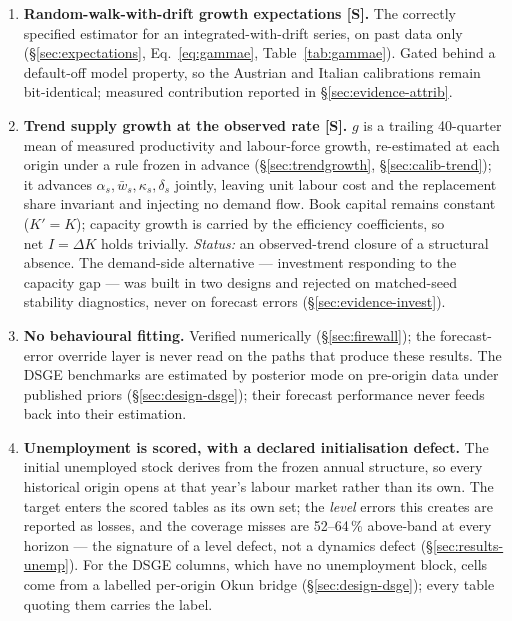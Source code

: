 \documentclass[11pt,a4paper]{article}
\begin{document}
\begin{enumerate}[label=\textbf{A\arabic*.},leftmargin=2.6em,itemsep=4pt]
\item \textbf{Random-walk-with-drift growth expectations [S].} The correctly specified estimator
for an integrated-with-drift series, on past data only (\S\ref{sec:expectations},
Eq.~\eqref{eq:gammae}, Table~\ref{tab:gammae}). Gated behind a default-off model property, so the
Austrian and Italian calibrations remain bit-identical; measured contribution reported in
\S\ref{sec:evidence-attrib}.

\item \textbf{Trend supply growth at the observed rate [S].} $g$ is a trailing 40-quarter mean of
measured productivity and labour-force growth, re-estimated at each origin under a rule frozen in
advance (\S\ref{sec:trendgrowth}, \S\ref{sec:calib-trend}); it advances $\alpha_s, \bar w_s,
\kappa_s, \delta_s$ jointly, leaving unit labour cost and the replacement share invariant and
injecting no demand flow. Book capital remains constant ($K'=K$); capacity growth is carried by
the efficiency coefficients, so $\text{net }I=\Delta K$ holds trivially. \emph{Status:} an
observed-trend closure of a structural absence. The demand-side alternative --- investment
responding to the capacity gap --- was built in two designs and rejected on matched-seed
stability diagnostics, never on forecast errors (\S\ref{sec:evidence-invest}).

\item \textbf{No behavioural fitting.} Verified numerically (\S\ref{sec:firewall}); the
forecast-error override layer is never read on the paths that produce these results. The DSGE
benchmarks are estimated by posterior mode on pre-origin data under published priors
(\S\ref{sec:design-dsge}); their forecast performance never feeds back into their estimation.

\item \textbf{Unemployment is scored, with a declared initialisation defect.} The initial
unemployed stock derives from the frozen annual structure, so every historical origin opens at
that year's labour market rather than its own. The target enters the scored tables as its own
set; the \emph{level} errors this creates are reported as losses, and the coverage misses are
52--64\,\% above-band at every horizon --- the signature of a level defect, not a dynamics
defect (\S\ref{sec:results-unemp}). For the DSGE columns, which have no unemployment block,
cells come from a labelled per-origin Okun bridge (\S\ref{sec:design-dsge}); every table quoting
them carries the label.


\end{enumerate}
\end{document}

